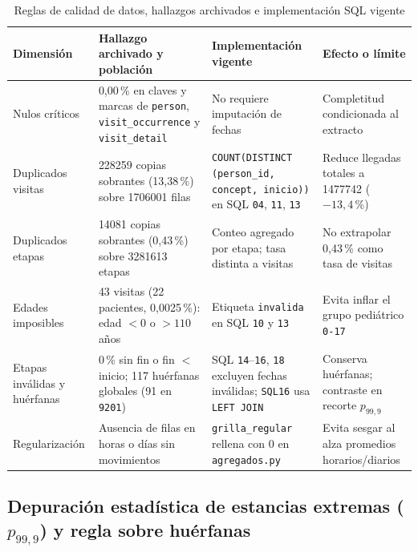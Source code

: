 \begin{table}[t]
\caption{Reglas de calidad de datos, hallazgos archivados e implementación SQL vigente}
\label{tab:reglas_calidad}
\centering
\footnotesize
\begin{tabularx}{\textwidth}{@{}L{0.17\textwidth} L{0.31\textwidth} L{0.25\textwidth} Y@{}}
\toprule
Dimensión & Hallazgo archivado y población & Implementación vigente & Efecto o límite \\
\midrule
Nulos críticos & 0,00\,\% en claves y marcas de \texttt{person}, \texttt{visit\_occurrence} y \texttt{visit\_detail} & No requiere imputación de fechas & Completitud condicionada al extracto \\
Duplicados visitas & \num{228259} copias sobrantes (13,38\,\%) sobre \num{1706001} filas & \texttt{COUNT(DISTINCT (person\_id, concept, inicio))} en SQL \texttt{04}, \texttt{11}, \texttt{13} & Reduce llegadas totales a \num{1477742} ($-13{,}4\,\%$) \\
Duplicados etapas & \num{14081} copias sobrantes (0,43\,\%) sobre \num{3281613} etapas & Conteo agregado por etapa; tasa distinta a visitas & No extrapolar 0,43\,\% como tasa de visitas \\
Edades imposibles & 43 visitas (22 pacientes, 0,0025\,\%): edad $<0$ o $>110$ años & Etiqueta \texttt{invalida} en SQL \texttt{10} y \texttt{13} & Evita inflar el grupo pediátrico \texttt{0-17} \\
Etapas inválidas y huérfanas & 0\,\% sin fin o fin $<$ inicio; 117 huérfanas globales (91 en \texttt{9201}) & SQL \texttt{14}--\texttt{16}, \texttt{18} excluyen fechas inválidas; \texttt{SQL16} usa \texttt{LEFT JOIN} & Conserva huérfanas; contraste en recorte $p_{99{,}9}$ \\
Regularización & Ausencia de filas en horas o días sin movimientos & \texttt{grilla\_regular} rellena con 0 en \texttt{agregados.py} & Evita sesgar al alza promedios horarios/diarios \\
\bottomrule
\end{tabularx}
\end{table}

\subsection{Depuración estadística de estancias extremas (\texorpdfstring{$p_{99{,}9}$}{p99.9}) y regla sobre huérfanas}

